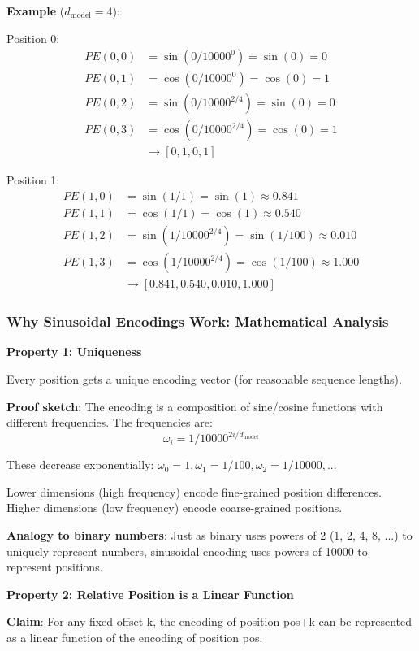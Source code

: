 \documentclass[11pt,oneside]{book}
\begin{document}
\textbf{Example} ($d_{\text{model}} = 4$):

Position 0:
\begin{align*}
PE(0, 0) &= \sin(0/10000^0) = \sin(0) = 0 \\
PE(0, 1) &= \cos(0/10000^0) = \cos(0) = 1 \\
PE(0, 2) &= \sin(0/10000^{2/4}) = \sin(0) = 0 \\
PE(0, 3) &= \cos(0/10000^{2/4}) = \cos(0) = 1 \\
&\to [0, 1, 0, 1]
\end{align*}

Position 1:
\begin{align*}
PE(1, 0) &= \sin(1/1) = \sin(1) \approx 0.841 \\
PE(1, 1) &= \cos(1/1) = \cos(1) \approx 0.540 \\
PE(1, 2) &= \sin(1/10000^{2/4}) = \sin(1/100) \approx 0.010 \\
PE(1, 3) &= \cos(1/10000^{2/4}) = \cos(1/100) \approx 1.000 \\
&\to [0.841, 0.540, 0.010, 1.000]
\end{align*}

\subsubsection{Why Sinusoidal Encodings Work: Mathematical Analysis}

\textbf{Property 1: Uniqueness}

Every position gets a unique encoding vector (for reasonable sequence lengths).

\textbf{Proof sketch}: The encoding is a composition of sine/cosine functions with different frequencies. The frequencies are:
\[
\omega_i = 1 / 10000^{2i/d_{\text{model}}}
\]

These decrease exponentially: $\omega_0 = 1, \omega_1 = 1/100, \omega_2 = 1/10000, ...$

Lower dimensions (high frequency) encode fine-grained position differences. Higher dimensions (low frequency) encode coarse-grained positions.

\textbf{Analogy to binary numbers}: Just as binary uses powers of 2 (1, 2, 4, 8, ...) to uniquely represent numbers, sinusoidal encoding uses powers of 10000 to represent positions.

\textbf{Property 2: Relative Position is a Linear Function}

\textbf{Claim}: For any fixed offset k, the encoding of position pos+k can be represented as a linear function of the encoding of position pos.
\end{document}
